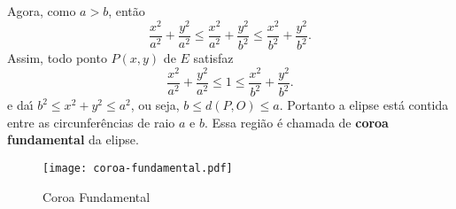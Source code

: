 Agora, como $a > b$, ent\~ao
\[
  \dfrac{x^2}{a^2} + \dfrac{y^2}{a^2} \le \dfrac{x^2}{a^2} + \dfrac{y^2}{b^2} \le \dfrac{x^2}{b^2} + \dfrac{y^2}{b^2}.
\]
Assim, todo ponto $P(x,y)$ de $E$ satisfaz
\[
  \dfrac{x^2}{a^2} + \dfrac{y^2}{a^2} \le 1 \le \dfrac{x^2}{b^2} + \dfrac{y^2}{b^2}.
\]
e da{\'\i} $b^2 \le x^2 + y^2 \le a^2$, ou seja, $b \le d(P,O) \le a$. Portanto a elipse est\'a contida entre as circunfer\^encias de raio $a$ e $b$. Essa regi\~ao \'e chamada de \textbf{coroa fundamental} da elipse.
\begin{figure}[!h]
  \centering
  \caption{Coroa Fundamental}
  \texttt{[image: coroa-fundamental.pdf]}

\end{figure}

